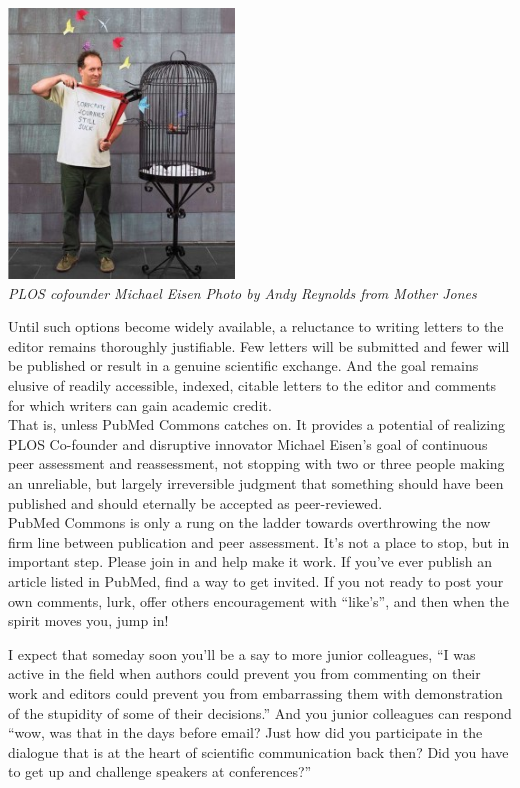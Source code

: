 \documentclass[11pt,twoside,a4paper]{article}
\begin{document}
\begin{minipage}[h]{6.25cm}
	\includegraphics[width=6.00cm]{img/eisen_630-251x300.jpg}~\\
	\emph{\small PLOS cofounder Michael Eisen Photo by Andy Reynolds from Mother Jones}
\end{minipage} \hfill \begin{minipage}[h]{12.75cm}
	Until such options become widely available, a reluctance to writing letters to the editor remains thoroughly justifiable. Few letters will be submitted and fewer will be published or result in a genuine scientific exchange. And the goal remains elusive of readily accessible, indexed, citable letters to the editor and comments for which writers can gain academic credit. ~\\
	
	That is, unless PubMed Commons catches on.  It provides a potential of realizing PLOS Co-founder and disruptive innovator Michael Eisen's goal of continuous peer assessment and reassessment, not stopping with two or three people making an unreliable, but largely irreversible judgment that something should have been published and should eternally be accepted as peer-reviewed. ~\\
	
	PubMed Commons is only a rung on the ladder towards overthrowing the now firm line between publication and peer assessment. It's not a place to stop, but in important step. Please join in and help make it work. If you've ever publish an article listed in PubMed, find a way to get invited. If you not ready to post your own comments, lurk, offer others encouragement with ``like's'', and then when the spirit moves you, jump in! ~\\
\end{minipage}

I expect that someday soon you'll be a say to more junior colleagues, ``I was active in the field when authors could prevent you from commenting on their work and editors could prevent you from embarrassing them with demonstration of the stupidity of some of their decisions.'' And you junior colleagues can respond ``wow, was that in the days before email? Just how did you participate in the dialogue that is at the heart of scientific communication back then? Did you have to get up and challenge speakers at conferences?'' ~\\
\end{document}

